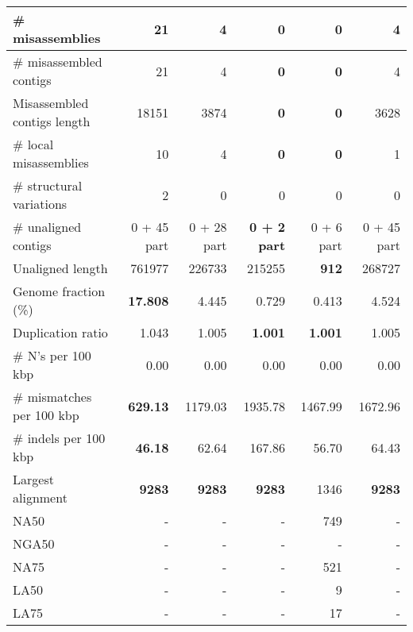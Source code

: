 \documentclass[12pt,a4paper]{article}
\begin{document}
\begin{table}[ht]
\begin{center}
\begin{tabular}{|l*{5}{|r}|}
\# misassemblies & 21 & 4 & {\bf 0} & {\bf 0} & 4 \\ \hline
\# misassembled contigs & 21 & 4 & {\bf 0} & {\bf 0} & 4 \\ \hline
Misassembled contigs length & 18151 & 3874 & {\bf 0} & {\bf 0} & 3628 \\ \hline
\# local misassemblies & 10 & 4 & {\bf 0} & {\bf 0} & 1 \\ \hline
\# structural variations & 2 & 0 & 0 & 0 & 0 \\ \hline
\# unaligned contigs & 0 + 45 part & 0 + 28 part & {\bf 0 + 2 part} & 0 + 6 part & 0 + 45 part \\ \hline
Unaligned length & 761977 & 226733 & 215255 & {\bf 912} & 268727 \\ \hline
Genome fraction (\%) & {\bf 17.808} & 4.445 & 0.729 & 0.413 & 4.524 \\ \hline
Duplication ratio & 1.043 & 1.005 & {\bf 1.001} & {\bf 1.001} & 1.005 \\ \hline
\# N's per 100 kbp & 0.00 & 0.00 & 0.00 & 0.00 & 0.00 \\ \hline
\# mismatches per 100 kbp & {\bf 629.13} & 1179.03 & 1935.78 & 1467.99 & 1672.96 \\ \hline
\# indels per 100 kbp & {\bf 46.18} & 62.64 & 167.86 & 56.70 & 64.43 \\ \hline
Largest alignment & {\bf 9283} & {\bf 9283} & {\bf 9283} & 1346 & {\bf 9283} \\ \hline
NA50 & - & - & - & 749 & - \\ \hline
NGA50 & - & - & - & - & - \\ \hline
NA75 & - & - & - & 521 & - \\ \hline
LA50 & - & - & - & 9 & - \\ \hline
LA75 & - & - & - & 17 & - \\ \hline
\end{tabular}
\end{center}
\end{table}
\end{document}
